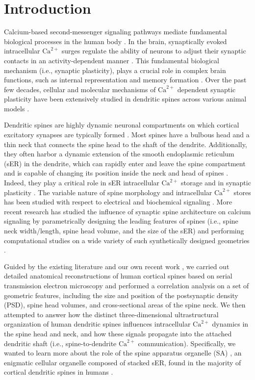 \documentclass[12pt]{article}
\begin{document}
\section*{Introduction}
Calcium-based second-messenger signaling pathways mediate fundamental biological processes in the human body \cite{Berridge2000}. In the brain, synaptically evoked intracellular $\textrm{Ca}^{2+}$  surges regulate the ability of neurons to adjust their synaptic contacts in an activity-dependent manner \cite{Holthoff2006,Higley2008}. This fundamental biological mechanism (i.e., synaptic plasticity), plays a crucial role in complex brain functions, such as internal representation and memory formation \cite{Sala2014,Padamsey2019}. Over the past few decades, cellular and molecular mechanisms of $\textrm{Ca}^{2+}$ dependent synaptic plasticity have been extensively studied in dendritic spines across various animal models \cite{Higley2012, Maggio2014}.  

Dendritic spines are highly dynamic neuronal compartments on which cortical excitatory synapses are typically formed \cite{Yuste1995,Amaral2009}. Most spines have a bulbous head and a thin neck that connects the spine head to the shaft of the dendrite. Additionally, they often harbor a dynamic extension of the smooth endoplasmic reticulum (sER) in the dendrite, which can rapidly enter and leave the spine compartment and is capable of changing its position inside the neck and head of spines \cite{PerezAlvarez2020}. Indeed, they play a critical role in sER intracellular $\textrm{Ca}^{2+}$ storage and in synaptic plasticity \cite{Verkhratsky2005,Vlachos2009,Holbro2009,Korkotian2014}.  The variable nature of spine morphology and intracellular $\textrm{Ca}^{2+}$ stores has been studied with respect to electrical and biochemical signaling \cite{Tonnesen2016, Nishiyama2015, Cartailler2018}. More recent research has studied the influence of synaptic spine architecture on calcium signaling by parametrically designing the leading features of spines (i.e., spine neck width/length, spine head volume, and the size of the sER) and performing computational studies on a wide variety of such synthetically designed geometries \cite{Bell2019, Basnayake2019, Breit2018}.	

Guided by the existing literature and our own recent work \cite{Breit2018, BreitQ2018, Lenz2021}, we carried out detailed anatomical reconstructions of human cortical spines based on serial transmission electron microscopy and performed a correlation analysis on a set of geometric features, including the size and position of the postsynaptic density (PSD), spine head volumes, and cross-sectional areas of the spine neck. We then attempted to answer how the distinct three-dimensional ultrastructural organization of human dendritic spines influences intracellular $\textrm{Ca}^{2+}$ dynamics in the spine head and neck, and how these signals propagate into the attached dendritic shaft (i.e., spine-to-dendrite $\textrm{Ca}^{2+}$ communication). Specifically, we wanted to learn more about the role of the spine apparatus organelle (SA) \cite{GRAY1959, Spacek1985, Spacek1997}, an enigmatic cellular organelle composed of stacked sER, found in the majority of cortical dendritic spines in humans \cite{Lenz2021}.
\end{document}
